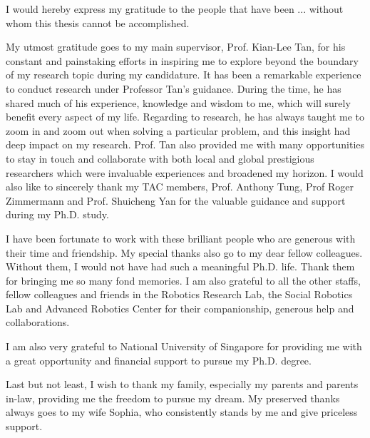 \begin{acknowledgements}
I would hereby express my gratitude to the people that have been ... without whom this thesis cannot be accomplished. 

My utmost gratitude goes to my main supervisor, Prof. Kian-Lee Tan, for his constant and painstaking efforts in inspiring me to explore
beyond the boundary of my research topic during my candidature. It has been a
remarkable experience to conduct research under Professor Tan's guidance. During
the time, he has shared much of his experience, knowledge and wisdom to me, which
will surely benefit every aspect of my life. Regarding to research, he has always taught
me to zoom in and zoom out when solving a particular problem, and this insight had
deep impact on my research. Prof. Tan also provided me with many opportunities to
stay in touch and collaborate with both local and global prestigious researchers which
were invaluable experiences and broadened my horizon. I would also like to sincerely
thank my TAC members, Prof. Anthony Tung, Prof Roger Zimmermann and Prof. Shuicheng Yan for the valuable guidance and support
during my Ph.D. study. 

I have been fortunate to work with these brilliant people
who are generous with their time and friendship. My special thanks also go to my dear fellow colleagues. Without them, I would not have had such a meaningful Ph.D. life.
Thank them for bringing me so many fond memories. I am also grateful to all the
other staffs, fellow colleagues and friends in the Robotics Research Lab, the Social
Robotics Lab and Advanced Robotics Center for their companionship, generous help
and collaborations.

I am also very grateful to National University of Singapore for providing me with a great opportunity and financial support to pursue my Ph.D. degree.

Last but not least, I wish to thank my family, especially my parents and parents in-law, providing me the freedom to pursue my dream. My preserved thanks always goes to my wife Sophia, who consistently stands by me and give priceless support.
\end{acknowledgements}